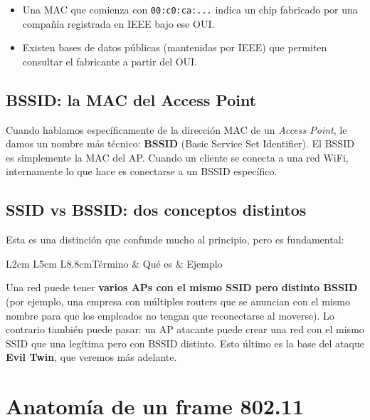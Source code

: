 \documentclass[11pt,a4paper]{article}
\begin{document}
\begin{itemize}
  \item Una MAC que comienza con \texttt{00:c0:ca:...} indica un chip
    fabricado por una compañía registrada en IEEE bajo ese OUI.
  \item Existen bases de datos públicas (mantenidas por IEEE) que permiten
    consultar el fabricante a partir del OUI.
\end{itemize}

\subsection{BSSID: la MAC del Access Point}
Cuando hablamos específicamente de la dirección MAC de un \emph{Access
Point}, le damos un nombre más técnico: \textbf{BSSID} (Basic Service Set
Identifier). El BSSID es simplemente la MAC del AP. Cuando un cliente se
conecta a una red WiFi, internamente lo que hace es conectarse a un BSSID
específico.

\subsection{SSID vs BSSID: dos conceptos distintos}
Esta es una distinción que confunde mucho al principio, pero es
fundamental:

\begin{datatable}{L{2cm} L{5cm} L{8.8cm}}{Término & Qué es & Ejemplo}
\end{datatable}

Una red puede tener \textbf{varios APs con el mismo SSID pero distinto
BSSID} (por ejemplo, una empresa con múltiples routers que se anuncian con
el mismo nombre para que los empleados no tengan que reconectarse al
moverse). Lo contrario también puede pasar: un AP atacante puede crear una
red con el mismo SSID que una legítima pero con BSSID distinto. Esto
último es la base del ataque \textbf{Evil Twin}, que veremos más adelante.

\section{Anatomía de un frame 802.11}
\end{document}
